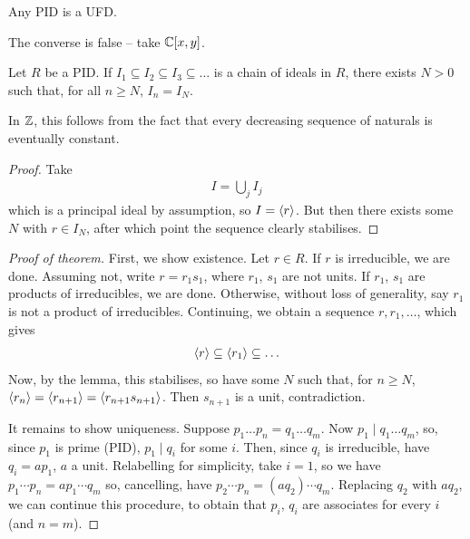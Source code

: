 \documentclass{../../template/note}
\begin{document}

    \begin{theorem}
        Any PID is a UFD.
    \end{theorem}

    \begin{remark*}
        The converse is false -- take $\mathbb C[x, y]$.
    \end{remark*}
    
    \begin{lemma}
        Let $R$ be a PID. If $I_1 \subseteq I_2 \subseteq I_3 \subseteq \dots$ is a chain of ideals in $R$, there exists $N > 0$ such that, for all $n \geq N$, $I_n = I_N$.
    \end{lemma}
    
    \begin{remark*}
        In $\mathbb Z$, this follows from the fact that every decreasing sequence of naturals is eventually constant.
    \end{remark*}

    \begin{proof}
        Take
        \begin{align*}
            I = \bigcup_j I_j
        \end{align*}
        which is a principal ideal by assumption, so $I = \left \langle r \right \rangle$. But then there exists some $N$ with $r \in I_N$, after which point the sequence clearly stabilises.
    \end{proof}
    
    \begin{proof}[Proof of theorem]
        First, we show existence. Let $r \in R$. If $r$ is irreducible, we are done. Assuming not, write $r = r_1s_1$, where $r_1$, $s_1$ are not units. If $r_1$, $s_1$ are products of irreducibles, we are done. Otherwise, without loss of generality, say $r_1$ is not a product of irreducibles. Continuing, we obtain a sequence $r, r_1, \dots$, which gives
        \begin{align*}
            \left \langle r \right \rangle \subseteq \left \langle r_1 \right \rangle \subseteq \dots 
        \end{align*}
        Now, by the lemma, this stabilises, so have some $N$ such that, for $n \geq N$, $\left \langle r_n \right \rangle = \left \langle r_{n+1} \right \rangle = \left \langle r_{n+1}s_{n+1} \right \rangle$. Then $s_{n+1}$ is a unit, contradiction.

        It remains to show uniqueness. Suppose $p_1 \dots p_n = q_1 \dots q_m$. Now $p_1 \mid q_1 \dots q_m$, so, since $p_1$ is prime (PID), $p_1 \mid q_i$ for some $i$. Then, since $q_i$ is irreducible, have $q_i = ap_1$, $a$ a unit. Relabelling for simplicity, take $i=1$, so we have $p_1 \cdots p_n = ap_1 \cdots q_m$ so, cancelling, have $p_2 \cdots p_n = (aq_2) \cdots q_m$. Replacing $q_2$ with $aq_2$, we can continue this procedure, to obtain that $p_i$, $q_i$ are associates for every $i$ (and $n=m$).
    \end{proof}
    
\end{document}
